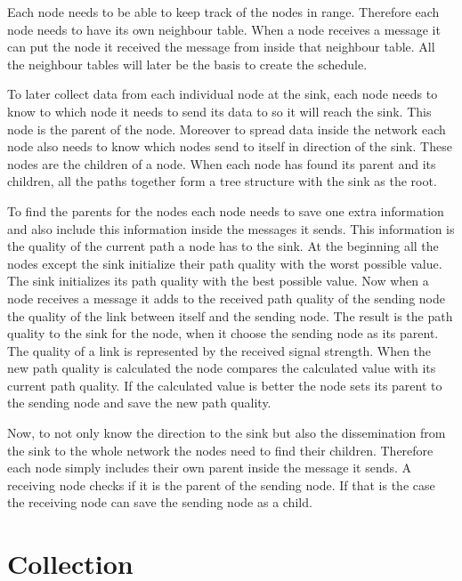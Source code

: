 Each node needs to be able to keep track of the nodes in range. Therefore each node needs to have its own neighbour table. When a node receives a message it can put the node it received the message from inside that neighbour table. All the neighbour tables will later be the basis to create the schedule.

To later collect data from each individual node at the sink, each node needs to know to which node it needs to send its data to so it will reach the sink. This node is the parent of the node. Moreover to spread data inside the network each node also needs to know which nodes send to itself in direction of the sink. These nodes are the children of a node. When each node has found its parent and its children, all the paths together form a tree structure with the sink as the root.

To find the parents for the nodes each node needs to save one extra information and also include this information inside the messages it sends. This information is the quality of the current path a node has to the sink. At the beginning all the nodes except the sink initialize their path quality with the worst possible value. The sink initializes its path quality with the best possible value. Now when a node receives a message it adds to the received path quality of the sending node the quality of the link between itself and the sending node. The result is the path quality to the sink for the node, when it choose the sending node as its parent. The quality of a link is represented by the received signal strength. When the new path quality is calculated the node compares the calculated value with its current path quality. If the calculated value is better the node sets its parent to the sending node and save the new path quality. 

Now, to not only know the direction to the sink but also the dissemination from the sink to the whole network the nodes need to find their children. Therefore each node simply includes their own parent inside the message it sends. A receiving node checks if it is the parent of the sending node. If that is the case the receiving node can save the sending node as a child.       

\section{Collection}
\label{chp:apr_collection}

